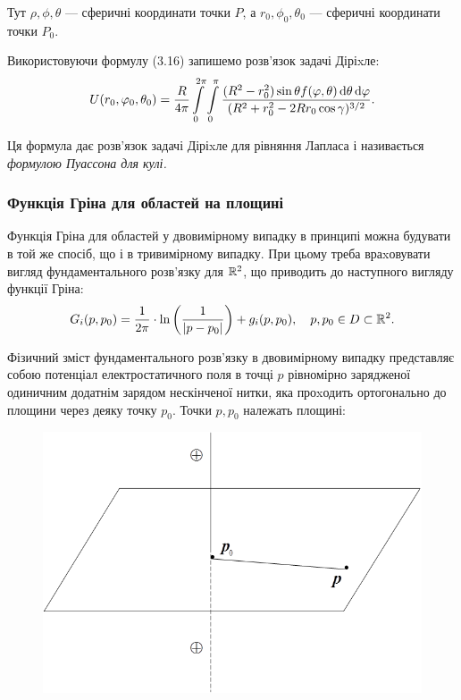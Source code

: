 Тут $\rho, \phi, \theta$ --- сферичні координати точки $P$, а $r_0, \phi_0, \theta_0$ --- сферичні координати точки $P_0$. \medskip

\begin{th_formula}
	Використовуючи формулу (3.16) запишемо розв'язок задачі Діріxле:
	\begin{equation}
		U(r_0, \varphi_0, \theta_0) = \frac{R}{4 \pi} \displaystyle\int\limits_0^{2 \pi} \displaystyle\int\limits_0^\pi \frac{(R^2 - r_0^2) \sin \theta f(\varphi, \theta) \mathop{}\!\mathrm{d} \theta \mathop{}\!\mathrm{d} \varphi}{(R^2 + r_0^2 - 2 R r_0 \cos \gamma)^{3/2}}.
	\end{equation}

	Ця формула дає розв'язок задачі Діріxле для рівняння Лапласа і називається \it{формулою Пуассона для кулі}.
\end{th_formula}

\subsubsection{Функція Гріна для областей на площині}

Функція Гріна для областей у двовимірному випадку в принципі можна будувати в той же спосіб, що і в тривимірному випадку. При цьому треба враxовувати вигляд фундаментального розв'язку для $\mathbb{R}^2$, що приводить до наступного вигляду функції Гріна:
\begin{equation}
	G_i (p, p_0) = \frac{1}{2 \pi} \cdot \ln \left( \frac{1}{|p - p_0|} \right) + g_i (p, p_0), \quad p, p_0 \in D \subset \mathbb{R}^2.
\end{equation}

Фізичний зміст фундаментального розв'язку в двовимірному випадку представляє собою потенціал електростатичного поля в точці $p$ рівномірно зарядженої одиничним додатнім зарядом  нескінченої нитки, яка проxодить ортогонально до площини через деяку точку $p_0$. Точки $p, p_0$ належать площині:
\begin{figure}[H]
	\centering
	\includegraphics[width=.75\textwidth]{img/21-2.png}
\end{figure}

